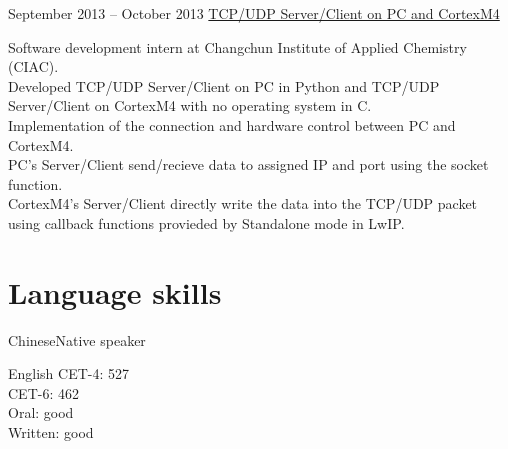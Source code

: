 \documentclass{tccv}
\begin{document}
\begin{eventlist}
  
\item{September 2013 -- October 2013}
  {}
  {\href{https://github.com/YoungLeeNENU/Cortex-M4-LED-Control}{TCP/UDP Server/Client on PC and CortexM4}}

  Software development intern at Changchun Institute of Applied Chemistry (CIAC).\\
  Developed TCP/UDP Server/Client on PC in Python and TCP/UDP Server/Client on CortexM4 with no operating system in C. \\
  Implementation of the connection and hardware control between PC and CortexM4.\\
  PC's Server/Client send/recieve data to assigned IP and port using the socket function.\\
  CortexM4's Server/Client directly write the data into the TCP/UDP packet using callback functions provieded by Standalone mode in LwIP.

  
\end{eventlist}




\section{Language skills}

\begin{factlist}
\item{Chinese}{Native speaker}
\item{English}{
    CET-4: 527\\
    CET-6: 462\\
    Oral: good\\
    Written: good}
\end{factlist}
\end{document}
